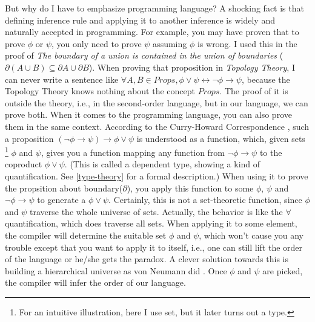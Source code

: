 But why do I have to emphasize programming language? A shocking fact is 
that defining inference rule and applying it to another inference is 
widely and naturally accepted in programming. For example, you may have
proven that to prove $\phi$ or $\psi$, you only need to prove $\psi$ 
assuming $\phi$ is wrong. I used this in the proof of 
{\it The boundary of a union is contained in the union of boundaries} 
($\partial(A\cup B)\subseteq \partial A \cup\partial B$). 
When proving that proposition in {\it Topology Theory}, I can never 
write a sentence like $\forall A,B\in Props,\phi\vee\psi \leftrightarrow
\neg\phi\rightarrow\psi$, because the Topology Theory knows nothing
about the concept $Props$. The proof of it is outside the theory,
i.e., in the second-order language, but in our language, we can
prove both. When it comes to the programming language, you can also
prove them in the same context. According to the Curry-Howard 
Correspondence \cite{Curry-Howard,Curry-Howard-Scheme}, such a
proposition $(\neg\phi\to\psi)\to\phi\vee\psi$ is understood as a 
function, which, given sets \footnote{For an intuitive illustration, 
here I use set, but it later turns out a type.} $\phi$ and $\psi$, 
gives you a function mapping any function from 
$\neg\phi\to\psi$ to the coproduct $\phi\vee\psi$. (This is 
called a dependent type, showing a kind of quantification. See 
\autoref{type-theory} for a formal description.) When using it to
prove the propsition about boundary($\partial$), you apply this
function to some $\phi$, $\psi$ and $\neg\phi\to\psi$ to generate
a $\phi\vee\psi$. Certainly, this is not a set-theoretic function,
since $\phi$ and $\psi$ traverse the whole universe of sets. Actually,
the behavior is like the $\forall$ quantification, which does traverse
all sets. When applying it to some element, the compiler will determine
the suitable set $\phi$ and $\psi$, which won't cause you any trouble
except that you want to apply it to itself, i.e., one can still lift
the order of the language or he/she gets the paradox. A clever solution 
towards this is building a hierarchical universe as von Neumann did 
\cite{von-Neumann-universe}. Once $\phi$ and $\psi$ are picked, the 
compiler will infer the order of our language. 

